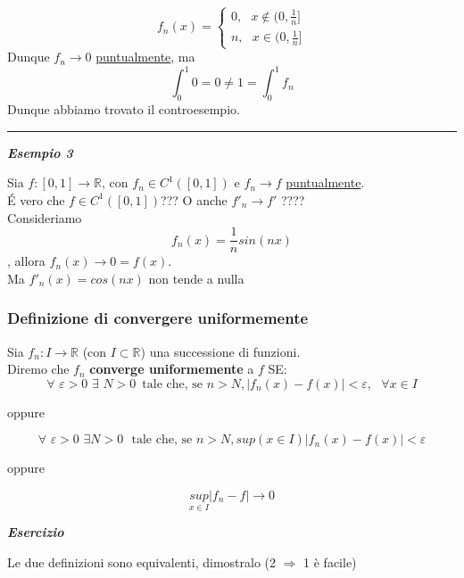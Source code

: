 \documentclass{article}
\theoremstyle{definition}
\newcommand{\R}{\mathbb{R}}
\begin{document}
\begin{equation}
    f_n(x)=\begin{cases}
        0, \,\,\,\, x \notin (0, \frac{1}{n}] \\
        n, \,\,\,\, x \in (0, \frac{1}{n}]
    \end{cases}
\end{equation}
Dunque $f_n \to 0$ \underline{puntualmente}, ma
\begin{equation}
    \int_0^1 0 = 0 \neq 1=\int_0^1 f_n
\end{equation}
Dunque abbiamo trovato il controesempio.

\vspace{15 pt}
\hrule
\vspace{15 pt}
\begin{center}
    \textbf{\textit{Esempio 3}}
\end{center}
Sia $f:[0,1] \to \R$, con $f_n \in C^1([0,1])$ e $f_n \to f$ \underline{puntualmente}.
\\
\'E vero che $f \in C^1([0,1])$??? O anche $f'_n \to f'$ ????
\\
Consideriamo \begin{equation}
    f_n(x)=\frac{1}{n}sin(nx)
\end{equation}, allora $f_n(x) \to 0=f(x)$.
\\
Ma $f'_n(x)= cos(nx)$ non tende a nulla

\subsubsection{Definizione di convergere uniformemente}
Sia $f_n: I \to \R$ (con $I \subset \R$) una successione di funzioni.
\\
Diremo che $f_n$ \textbf{converge uniformemente} a $f$ SE:
\begin{equation}
    \forall \,\, \varepsilon > 0 \,\, \exists \,\, N > 0 \,\,\, \text{tale che, se $n > N$}, |f_n(x) - f(x)| < \varepsilon, \,\,\,\, \forall x \in I
\end{equation}
\begin{center}
    oppure
\end{center}
\begin{equation}
    \forall \,\, \varepsilon > 0 \,\, \exists N > 0 \,\,\,\, \text{tale che, se $n > N$}, sup(x \in I)|f_n(x)-f(x)| < \varepsilon
\end{equation}
\begin{center}
    oppure
\end{center}
\begin{equation}
   \underset{x \in I}{sup}\left|f_n - f\right| \to 0 
\end{equation}
\begin{center}
    \textbf{\textit{Esercizio}}
\end{center}
Le due definizioni sono equivalenti, dimostralo (2 $\Longrightarrow$ 1 è facile)
\end{document}
